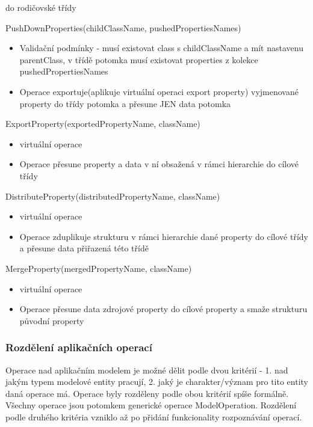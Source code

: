 \documentclass[11pt,twoside,a4paper]{book}
\begin{document}
\begin{list}{Operace :}{}
\begin{itemize}
    do rodičovské třídy
  \end{itemize}
  \item PushDownProperties(childClassName, pushedPropertiesNames)
  \begin{itemize}
    \item Validační podmínky - musí existovat class s childClassName a mít
    nastavenu parentClass, v třídě potomka musí existovat properties z kolekce
    pushedPropertiesNames
    \item Operace exportuje(aplikuje virtuální operaci export property) 
   vyjmenované property do třídy potomka a přesune JEN data potomka
  \end{itemize}
  \item ExportProperty(exportedPropertyName, className)
  \begin{itemize}
    \item virtuální operace
    \item Operace přesune property a data v ní obsažená v rámci hierarchie do
    cílové třídy
  \end{itemize}
  \item DistributeProperty(distributedPropertyName, className)
  \begin{itemize}
    \item virtuální operace
    \item Operace zduplikuje strukturu v rámci hierarchie dané property do
    cílové třídy a přesune data přiřazená této třídě
  \end{itemize}
  \item MergeProperty(mergedPropertyName, className)
  \begin{itemize}
    \item virtuální operace
    \item Operace přesune data zdrojové property do cílové property a smaže
    strukturu původní property
  \end{itemize}
\end{list}

\subsubsection {Rozdělení aplikačních operací} 

Operace nad aplikačním modelem je možné dělit podle dvou kritérií - 1. nad jakým
typem modelové entity pracují, 2. jaký je charakter/význam pro tito entity daná
operace má. Operace byly rozděleny podle obou kritérií spíše formálně. Všechny operace
jsou potomkem generické operace ModelOperation. Rozdělení podle druhého kritéria
vzniklo až po přidání funkcionality rozpoznávání operací.
\end{document}
